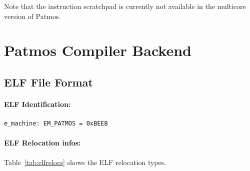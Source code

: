 Note that the instruction scratchpad is currently not available in the multicore version of Patmos.



%



\section{Patmos Compiler Backend}
\label{sec:toolchain:backend}

\subsection{ELF File Format}

\paragraph{ELF Identification:}

\begin{verbatim}
e_machine: EM_PATMOS = 0xBEEB
\end{verbatim}

\paragraph{ELF Relocation infos:}
Table~\ref{tab:elfrelocs} shows the ELF relocation types.

